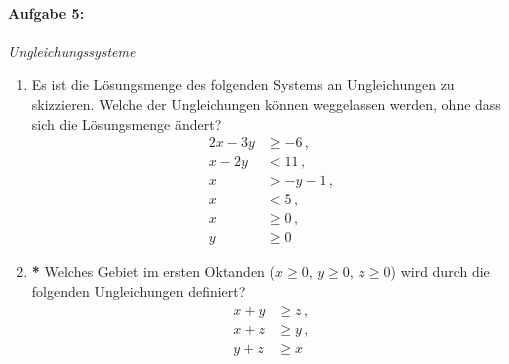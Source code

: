 \paragraph{Aufgabe 5: } \emph{Ungleichungssysteme}
\begin{enumerate}[label=(\alph*), labelindent=1em,labelsep=0.5cm]
\item Es ist die Lösungsmenge des folgenden Systems an Ungleichungen zu skizzieren. Welche der Ungleichungen können weggelassen werden, ohne dass sich die Lösungsmenge ändert?
\begin{align*}
    2x-3y&\geq -6\,,\\
    x-2y&< 11\,,\\
    x&>-y-1\,,\\
    x&<5\,,\\
    x&\geq 0\,,\\
    y&\geq 0
\end{align*}
\item \textbf{*} Welches Gebiet im ersten Oktanden ($x\ge 0$, $y\ge 0$, $z\ge 0$) wird durch die folgenden Ungleichungen definiert?
\begin{align*}
    x+y&\ge z\,,\\
    x+z&\ge y\,,\\
    y+z&\ge x
\end{align*}
\end{enumerate}